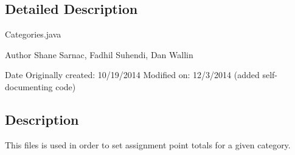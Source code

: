 \subsection{Detailed Description}
Categories.\-java

\begin{DoxyAuthor}{Author}
Shane Sarnac, Fadhil Suhendi, Dan Wallin 

 
\end{DoxyAuthor}
\begin{DoxyDate}{Date}
Originally created\-: 10/19/2014  Modified on\-: 12/3/2014 (added self-\/documenting code)
\end{DoxyDate}


\hypertarget{index_desc}{}\subsection{Description}\label{index_desc}
This files is used in order to set assignment point totals for a given category. 

